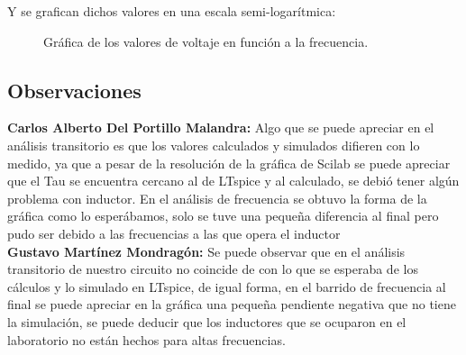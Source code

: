 \documentclass{article}
\begin{document}
Y se grafican dichos valores en una escala semi-logarítmica: 

\begin{figure}[H]
	\centering
	\centering
	\caption{Gráfica de los valores de voltaje en función a la frecuencia.} 
\end{figure}


\subsection{Observaciones}
\textbf{Carlos Alberto Del Portillo Malandra:} 
Algo que se puede apreciar en el análisis transitorio es que los valores calculados y simulados difieren con lo medido, ya que a pesar de la resolución de la gráfica de Scilab se puede apreciar que el Tau se encuentra cercano al de LTspice y al calculado, se debió tener algún problema con inductor. En el análisis de frecuencia se obtuvo la forma de la gráfica como lo esperábamos, solo se tuve una pequeña diferencia al final pero pudo ser debido a las frecuencias a las que opera el inductor\\


\textbf{Gustavo Martínez Mondragón:} 
Se puede observar que en el análisis transitorio de nuestro circuito no coincide de con lo que se esperaba de los cálculos y lo simulado en LTspice, de igual forma, en el barrido de frecuencia al final se puede apreciar en la gráfica una pequeña pendiente negativa que no tiene la simulación, se puede deducir que los inductores que se ocuparon en el laboratorio no están hechos para altas frecuencias.
\end{document}
